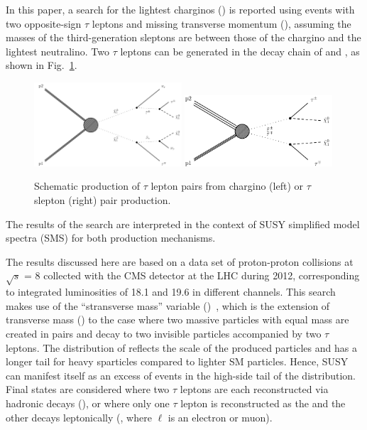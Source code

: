 In this paper, a search for the lightest charginos (\chione) is reported using events 
with two opposite-sign $\tau$ leptons and 
missing transverse momentum (\MPT), assuming the masses of the third-generation sleptons are between those of the 
chargino and the lightest neutralino. 
Two $\tau$ leptons can be generated in the decay chain of \chione and \sTau, as shown in Fig.~\ref{fig:Productions}. 
\begin{figure}[!htb]
\centering
\includegraphics[width=0.49\textwidth]{Introductionfigs/TChipmSlepSnu.pdf}
\includegraphics[width=0.49\textwidth]{Introductionfigs/TSlepSlep.pdf}
\caption{Schematic production of $\tau$ lepton pairs from chargino (left) or $\tau$ slepton (right) pair production.}
\label{fig:Productions}
\end{figure}
The results of the search are interpreted in the context of SUSY simplified model spectra (SMS) \cite{Alwall:2008ag,alves:sms} for both
production mechanisms.


The results discussed here are based on a data set of proton-proton 
collisions at $\sqrt{s}$ = 8\TeV
collected with the CMS detector at the LHC during 2012, corresponding to integrated
luminosities of 18.1 and 19.6 \invfb in different channels. 
This search makes use of the ``stransverse mass'' variable (\mttwo)~\cite{Lester:1999tx,Barr:2003rg},
which is the extension of transverse mass (\mt) to the case 
where two massive particles with equal mass are created in pairs  
and decay to two invisible particles accompanied by two $\tau$ leptons.  
The distribution of \mttwo reflects the scale of the produced particles and has a longer tail for heavy sparticles
compared to lighter SM particles. Hence, SUSY 
can manifest itself
as an excess of events in the high-side tail of the \mttwo distribution. 
Final states are considered where
two $\tau$ leptons are each reconstructed via hadronic decays (\tauTau), or where only one $\tau$ lepton is reconstructed as the \Tau and the other decays leptonically (\leptonTau, where $\ell$ is an electron or muon). 

